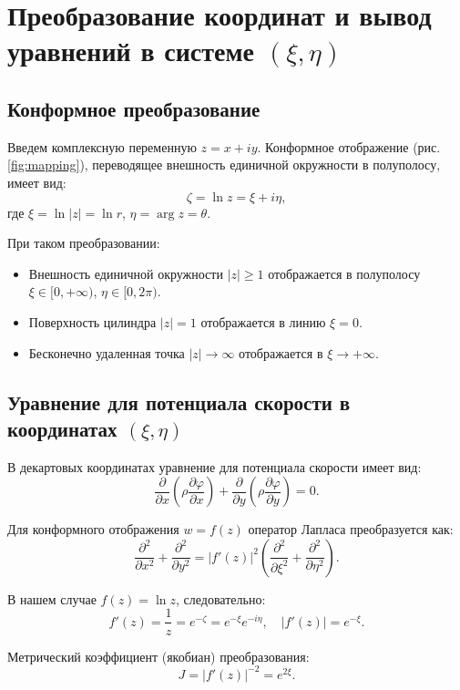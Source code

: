 \documentclass[a4paper,12pt]{article}
\begin{document}
	
	\section{Преобразование координат и вывод уравнений в системе $(\xi, \eta)$}
	
	\subsection{Конформное преобразование}

	Введем комплексную переменную $z = x + iy$. Конформное отображение (рис. \ref{fig:mapping}), переводящее внешность единичной окружности в полуполосу, имеет вид:
	\begin{equation}
		\zeta = \ln z = \xi + i\eta,
	\end{equation}
	где $\xi = \ln |z| = \ln r$, $\eta = \arg z = \theta$.
	
	При таком преобразовании:
	\begin{itemize}
		\item Внешность единичной окружности $|z| \ge 1$ отображается в полуполосу $\xi \in [0, +\infty)$, $\eta \in [0, 2\pi)$.
		\item Поверхность цилиндра $|z| = 1$ отображается в линию $\xi = 0$.
		\item Бесконечно удаленная точка $|z| \to \infty$ отображается в $\xi \to +\infty$.
	\end{itemize}
	
	\subsection{Уравнение для потенциала скорости в координатах $(\xi, \eta)$}
	В декартовых координатах уравнение для потенциала скорости имеет вид:
	\[
	\frac{\partial}{\partial x} \left( \rho \frac{\partial \varphi}{\partial x} \right) + \frac{\partial}{\partial y} \left( \rho \frac{\partial \varphi}{\partial y} \right) = 0.
	\]
	
	Для конформного отображения $w = f(z)$ оператор Лапласа преобразуется как:
	\[
	\frac{\partial^2}{\partial x^2} + \frac{\partial^2}{\partial y^2} = |f'(z)|^2 \left( \frac{\partial^2}{\partial \xi^2} + \frac{\partial^2}{\partial \eta^2} \right).
	\]
	
	В нашем случае $f(z) = \ln z$, следовательно:
	\[
	f'(z) = \frac{1}{z} = e^{-\zeta} = e^{-\xi} e^{-i\eta}, \quad |f'(z)| = e^{-\xi}.
	\]
	
	Метрический коэффициент (якобиан) преобразования:
	\[
	J = |f'(z)|^{-2} = e^{2\xi}.
	\]
	
\end{document}
